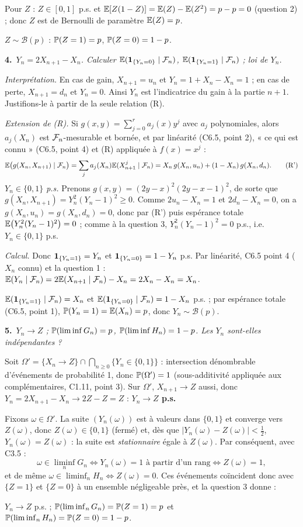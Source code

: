 \documentclass[11pt,a4paper]{article}
\newcommand{\question}[2]{\par\medskip\noindent\textbf{#1}~\textit{#2}\par\smallskip}
\begin{document}
\begin{exo}
Pour $Z$ : $Z\in[0,1]$ p.s. et $\mathbb{E}[Z(1-Z)]=\mathbb{E}(Z)-\mathbb{E}(Z^2)=p-p=0$ (question 2) ; donc $Z$ est de Bernoulli de paramètre $\mathbb{E}(Z)=p$.
\begin{resultat}$Z\sim\mathcal B(p)$ : $\mathbb{P}(Z=1)=p$, $\mathbb{P}(Z=0)=1-p$.\end{resultat}

\question{4.}{$Y_n=2X_{n+1}-X_n$. Calculer $\mathbb{E}(\mathbf{1}_{\{Y_n=0\}}\mid\mathcal{F}_n)$, $\mathbb{E}(\mathbf{1}_{\{Y_n=1\}}\mid\mathcal{F}_n)$ ; loi de $Y_n$.}
\emph{Interprétation.} En cas de gain, $X_{n+1}=u_n$ et $Y_n=1+X_n-X_n=1$ ; en cas de perte, $X_{n+1}=d_n$ et $Y_n=0$.
Ainsi $Y_n$ est l'indicatrice du gain à la partie $n+1$. Justifions-le à partir de la seule relation (R).

\emph{Extension de (R).} Si $g(x,y)=\sum_{j=0}^ra_j(x)y^j$ avec $a_j$ polynomiales, alors $a_j(X_n)$ est $\mathcal{F}_n$-mesurable et bornée, et
par linéarité (C6.5, point 2), « ce qui est connu » (C6.5, point 4) et (R) appliquée à $f(x)=x^j$ :
\[\mathbb{E}\bigl(g(X_n,X_{n+1})\mid\mathcal{F}_n\bigr)=\sum_ja_j(X_n)\mathbb{E}(X_{n+1}^j\mid\mathcal{F}_n)=X_n\,g(X_n,u_n)+(1-X_n)\,g(X_n,d_n).\tag{R'}\]
\emph{$Y_n\in\{0,1\}$ p.s.} Prenons $g(x,y)=(2y-x)^2(2y-x-1)^2$, de sorte que $g(X_n,X_{n+1})=Y_n^2(Y_n-1)^2\ge0$. Comme
$2u_n-X_n=1$ et $2d_n-X_n=0$, on a $g(X_n,u_n)=g(X_n,d_n)=0$, donc par (R') puis espérance totale $\mathbb{E}\bigl(Y_n^2(Y_n-1)^2\bigr)=0$ ;
comme à la question 3, $Y_n^2(Y_n-1)^2=0$ p.s., i.e.\ $Y_n\in\{0,1\}$ p.s.

\emph{Calcul.} Donc $\mathbf{1}_{\{Y_n=1\}}=Y_n$ et $\mathbf{1}_{\{Y_n=0\}}=1-Y_n$ p.s. Par linéarité, C6.5 point 4 ($X_n$ connu) et la question 1 :
$\mathbb{E}(Y_n\mid\mathcal{F}_n)=2\mathbb{E}(X_{n+1}\mid\mathcal{F}_n)-X_n=2X_n-X_n=X_n$.
\begin{resultat}$\mathbb{E}(\mathbf{1}_{\{Y_n=1\}}\mid\mathcal{F}_n)=X_n$ et $\mathbb{E}(\mathbf{1}_{\{Y_n=0\}}\mid\mathcal{F}_n)=1-X_n$ p.s. ; par espérance totale (C6.5, point 1),
$\mathbb{P}(Y_n=1)=\mathbb{E}(X_n)=p$, donc $Y_n\sim\mathcal B(p)$.\end{resultat}

\question{5.}{$Y_n\to Z$ ; $\mathbb{P}(\liminf G_n)=p$, $\mathbb{P}(\liminf H_n)=1-p$. Les $Y_n$ sont-elles indépendantes ?}
Soit $\Omega'=\{X_n\to Z\}\cap\bigcap_{n\ge0}\{Y_n\in\{0,1\}\}$ : intersection dénombrable d'événements de probabilité 1, donc
$\mathbb{P}(\Omega')=1$ (sous-additivité appliquée aux complémentaires, C1.11, point 3). Sur $\Omega'$, $X_{n+1}\to Z$ aussi, donc
$Y_n=2X_{n+1}-X_n\to2Z-Z=Z$ : \textbf{$Y_n\to Z$ p.s.}

Fixons $\omega\in\Omega'$. La suite $(Y_n(\omega))$ est à valeurs dans $\{0,1\}$ et converge vers $Z(\omega)$, donc $Z(\omega)\in\{0,1\}$
(fermé) et, dès que $|Y_n(\omega)-Z(\omega)|<\frac12$, $Y_n(\omega)=Z(\omega)$ : la suite est \emph{stationnaire} égale à $Z(\omega)$.
Par conséquent, avec C3.5 :
\[\omega\in\liminf_nG_n\iff Y_n(\omega)=1\text{ à partir d'un rang}\iff Z(\omega)=1,\]
et de même $\omega\in\liminf_nH_n\iff Z(\omega)=0$. Ces événements coïncident donc avec $\{Z=1\}$ et $\{Z=0\}$ à un ensemble négligeable
près, et la question 3 donne :
\begin{resultat}$Y_n\to Z$ p.s. ; $\mathbb{P}(\liminf_nG_n)=\mathbb{P}(Z=1)=p$ et $\mathbb{P}(\liminf_nH_n)=\mathbb{P}(Z=0)=1-p$.\end{resultat}


\end{exo}
\end{document}
